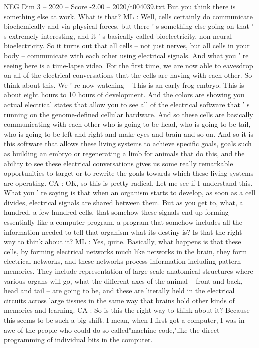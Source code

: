 \begin{textsample}{NEG Dim 3 – 2020 – Score -2.00 – 2020/t004039.txt}
But you think there is something else at work.
What is that?
ML : Well, cells certainly do communicate biochemically and via physical forces, but there ' s something else going on that ' s extremely interesting, and it ' s basically called bioelectricity, non-neural bioelectricity.
So it turns out that all cells -- not just nerves, but all cells in your body -- communicate with each other using electrical signals.
And what you ' re seeing here is a time-lapse video.
For the first time, we are now able to eavesdrop on all of the electrical conversations that the cells are having with each other.
So think about this.
We ' re now watching -- This is an early frog embryo.
This is about eight hours to 10 hours of development.
And the colors are showing you actual electrical states that allow you to see all of the electrical software that ' s running on the genome-defined cellular hardware.
And so these cells are basically communicating with each other who is going to be head, who is going to be tail, who is going to be left and right and make eyes and brain and so on.
And so it is this software that allows these living systems to achieve specific goals, goals such as building an embryo or regenerating a limb for animals that do this, and the ability to see these electrical conversations gives us some really remarkable opportunities to target or to rewrite the goals towards which these living systems are operating.
CA : OK, so this is pretty radical.
Let me see if I understand this.
What you ' re saying is that when an organism starts to develop, as soon as a cell divides, electrical signals are shared between them.
But as you get to, what, a hundred, a few hundred cells, that somehow these signals end up forming essentially like a computer program, a program that somehow includes all the information needed to tell that organism what its destiny is?
Is that the right way to think about it?
ML : Yes, quite.
Basically, what happens is that these cells, by forming electrical networks much like networks in the brain, they form electrical networks, and these networks process information including pattern memories.
They include representation of large-scale anatomical structures where various organs will go, what the different axes of the animal -- front and back, head and tail -- are going to be, and these are literally held in the electrical circuits across large tissues in the same way that brains hold other kinds of memories and learning.
CA : So is this the right way to think about it?
Because this seems to be such a big shift.
I mean, when I first got a computer, I was in awe of the people who could do so-called"machine code,"like the direct programming of individual bits in the computer.

\end{textsample}
